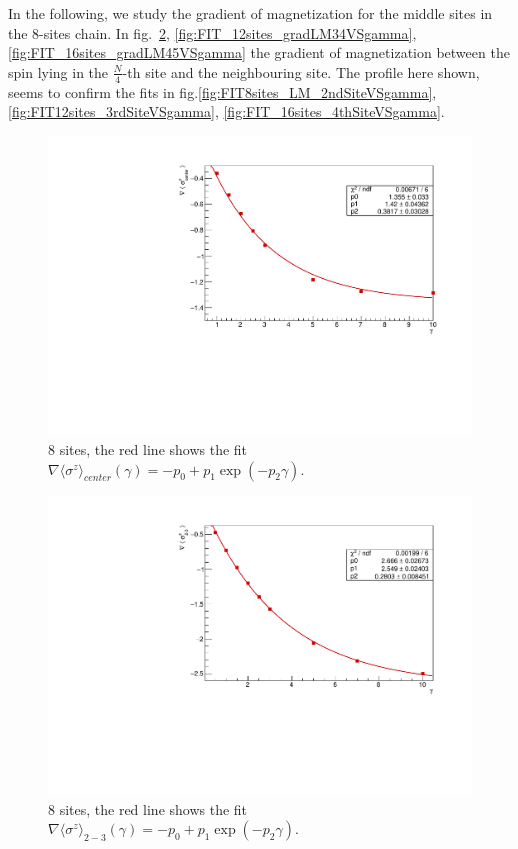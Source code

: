 In the following, we study the gradient of magnetization for the middle sites in the 8-sites chain. In fig.~\ref{fig:FIT_8sites_gradLM23VSgamma}, \ref{fig:FIT_12sites_gradLM34VSgamma}, \ref{fig:FIT_16sites_gradLM45VSgamma} the gradient of magnetization between the spin lying in the $\frac{N}{4}$-th site and the neighbouring site. The profile here shown, seems to confirm the fits in fig.\ref{fig:FIT8sites_LM_2ndSiteVSgamma}, \ref{fig:FIT12sites_3rdSiteVSgamma}, \ref{fig:FIT_16sites_4thSiteVSgamma}.

\begin{figure}[H]
    \centering
    \includegraphics[scale=0.7]{Figures/8sites/FIT_8sites_gradLMcenterVSgamma.pdf}
    \caption{8 sites, the red line shows the fit \\$\nabla \langle\sigma^z\rangle_{center}(\gamma) = -p_0+p_1\exp{(-p_2\gamma)}$.}
    \label{fig:FIT_8sites_gradLMcenterVSgamma}
\end{figure}

\begin{figure}[H]
    \centering
    \includegraphics[scale=0.7]{Figures/8sites/FIT_8sites_gradLM23VSgamma.pdf}
    \caption{8 sites, the red line shows the fit \\$\nabla \langle\sigma^z\rangle_{2-3}(\gamma) = -p_0+p_1\exp{(-p_2\gamma)}$.}
    \label{fig:FIT_8sites_gradLM23VSgamma}
\end{figure}

